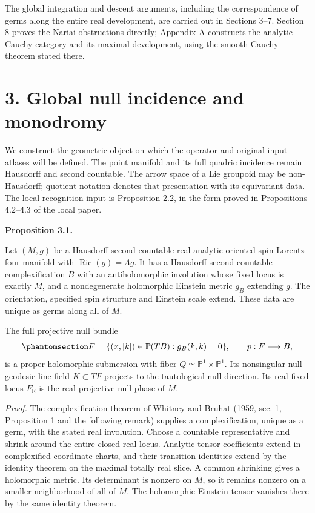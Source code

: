 \documentclass[
  english,
  11pt,
  reqno]{amsart}
\makeatletter
\newcommand{\pandocstatementheading}[1]{%
  \par\addpenalty{\@beginparpenalty}%
  \addvspace{.5\baselineskip plus .2\baselineskip minus .2\baselineskip}%
  {\normalfont\bfseries #1\par}%
  \nobreak\@afterindenttrue\@afterheading
}
\makeatother
\begin{document}
The global integration and descent arguments, including the
correspondence of germs along the entire real development, are carried
out in Sections 3--7. Section 8 proves the Nariai obstructions directly;
Appendix A constructs the analytic Cauchy category and its maximal
development, using the smooth Cauchy theorem stated there.

\protect{}\label{sec:global-null-monodromy-v08}

\section{3. Global null incidence and
monodromy}\label{global-null-incidence-and-monodromy}

We construct the geometric object on which the operator and
original-input atlases will be defined. The point manifold and its full
quadric incidence remain Hausdorff and second countable. The arrow space
of a Lie groupoid may be non-Hausdorff; quotient notation denotes that
presentation with its equivariant data. The local recognition input is
\hyperref[prop:independent-local-ray-recognition-v09]{Proposition 2.2},
in the form proved in Propositions 4.2--4.3 of the local paper.

\pandocstatementheading{\protect{}\label{prop:einstein-complexification-phase}Proposition 3.1.}

Let \((M,g)\) be a Hausdorff second-countable real analytic oriented
spin Lorentz four-manifold with \(\operatorname{Ric}(g)=\Lambda g\). It
has a Hausdorff second-countable complexification \(B\) with an
antiholomorphic involution whose fixed locus is exactly \(M\), and a
nondegenerate holomorphic Einstein metric \(g_B\) extending \(g\). The
orientation, specified spin structure and Einstein scale extend. These
data are unique as germs along all of \(M\).

The full projective null bundle
\begin{equation}\protect\phantomsection\label{eq:full-complex-null-phase-v08}{
F=\{(x,[k])\in\mathbb P(TB):g_B(k,k)=0\},
\qquad p:F\longrightarrow B,
}\end{equation} is a proper holomorphic submersion with fiber
\(Q\simeq\mathbb P^1\times\mathbb P^1\). Its nonsingular null-geodesic
line field \(K\subset TF\) projects to the tautological null direction.
Its real fixed locus \(F_{\mathbb R}\) is the real projective null phase
of \(M\).

\emph{Proof.} The complexification theorem of Whitney and Bruhat (1959,
sec. 1, Proposition 1 and the following remark) supplies a
complexification, unique as a germ, with the stated real involution.
Choose a countable representative and shrink around the entire closed
real locus. Analytic tensor coefficients extend in complexified
coordinate charts, and their transition identities extend by the
identity theorem on the maximal totally real slice. A common shrinking
gives a holomorphic metric. Its determinant is nonzero on \(M\), so it
remains nonzero on a smaller neighborhood of all of \(M\). The
holomorphic Einstein tensor vanishes there by the same identity theorem.
\end{document}
